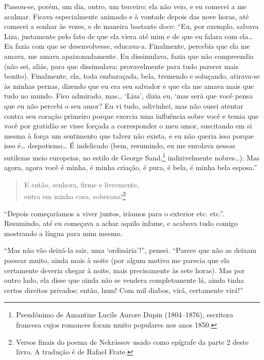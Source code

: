 Passou-se, porém, um dia, outro, um terceiro; ela não veio, e eu comecei
a me acalmar. Ficava especialmente animado e à vontade depois das nove
horas, até comecei a sonhar às vezes, e de maneira bastante doce: “Eu,
por exemplo, salvava Liza, justamente pelo fato de que ela viera até
mim e de que eu falara com ela\ldots{} Eu fazia com que se desenvolvesse,
educava-a. Finalmente, percebia que ela me amava, me amava
apaixonadamente. Eu dissimulava, fazia que não compreendia (não sei,
aliás, para que dissimulava; provavelmente para tudo parecer mais
bonito). Finalmente, ela, toda embaraçada, bela, tremendo e soluçando,
atirava-se às minhas pernas, dizendo que eu era seu salvador e que ela
me amava mais que tudo no mundo. Fico admirado, mas\ldots{} ‘Liza’, dizia
eu, ‘mas será que você pensa que eu não percebi o seu amor? Eu vi tudo,
adivinhei, mas não ousei atentar contra seu coração primeiro porque
exercia uma influência sobre você e temia que você por gratidão se
visse forçada a corresponder o meu amor, suscitando em si mesma à força um 
sentimento que talvez não exista, e eu não queria isso porque
isso é\ldots{} despotismo\ldots{} É indelicado (bem, resumindo, eu me enrolava
nessas sutilezas meio europeias, no estilo de George Sand,\footnote{
Pseudônimo de Amantine Lucile Aurore Dupin (1804--1876), escritora
francesa cujos romances foram muito populares nos anos 1850.}
indizivelmente nobres\ldots{}). Mas agora, agora você é minha, é minha
criação, é pura, é bela, é minha bela esposa.''

\medskip

\begin{verse}
E então, senhora, firme e livremente,\\
entra em minha casa, soberana!\footnote{ Versos finais do poema de
Nekrássov usado como epígrafe da parte 2 deste livro. A tradução é de Rafael
Frate.}
\end{verse}

\medskip

``Depois começaríamos a viver juntos, iríamos para o exterior etc. etc.''.
Resumindo, até eu começava a achar aquilo infame, e acabava tudo comigo
mostrando a língua para mim mesmo.

“Mas não vão deixá-la sair, uma ‘ordinária’!”, pensei. “Parece que não
as deixam passear muito, ainda mais à noite (por algum motivo me
parecia que ela certamente deveria chegar à noite, mais precisamente às
sete horas). Mas por outro lado, ela disse que ainda não se vendera
completamente lá, ainda tinha certos direitos privados; então, hum! Com
mil diabos, virá, certamente virá!”

